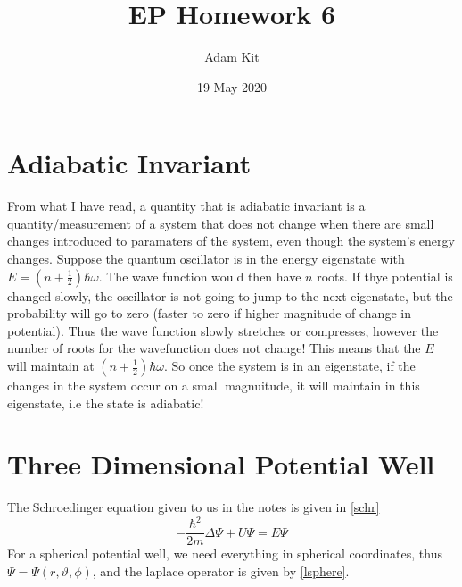 \documentclass{article}
\title{EP Homework 6}
\author{Adam Kit}
\date{19 May 2020}
\begin{document}
\maketitle
\section{Adiabatic Invariant}


From what I have read, a quantity that is adiabatic invariant is a quantity/measurement of a system that does not change when there are small changes introduced to paramaters of the system, even though the system's energy changes. Suppose the quantum oscillator is in the energy eigenstate with $E = (n+\frac{1}{2})\hbar \omega$. The wave function would then have $n$ roots. If thye potential is changed slowly, the oscillator is not going to jump to the next eigenstate, but the probability will go to zero (faster to zero if higher magnitude of change in potential). Thus the wave function slowly stretches or compresses, however the number of roots for the wavefunction does not change! This means that the $E$ will maintain at $(n+\frac{1}{2})\hbar \omega$. So once the system is in an eigenstate, if the changes in the system occur on a small magnuitude, it will maintain in this eigenstate, i.e the state is adiabatic!

\section{Three Dimensional Potential Well}

The Schroedinger equation given to us in the notes is given in \ref{schr}
\begin{equation}
-\frac{\hbar^2}{2m} \Delta \Psi + U \Psi = E \Psi
\label{schr}
\end{equation}
For a spherical potential well, we need everything in spherical coordinates, thus $\Psi = \Psi(r, \vartheta, \phi)$, and the laplace operator is given by \ref{lsphere}.
\end{document}
